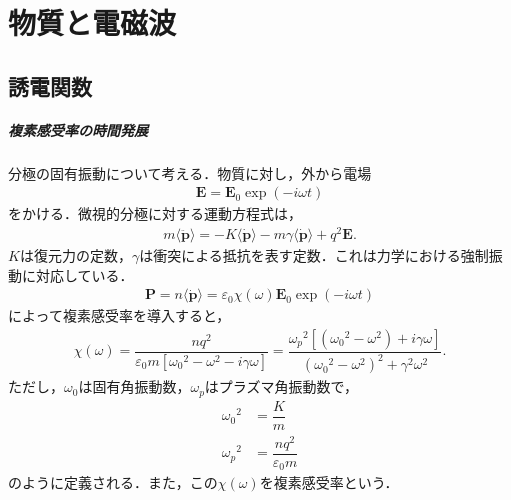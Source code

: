 \setcounter{chapter}{7}
\chapter{物質と電磁波}
\setcounter{section}{1}
\section{誘電関数}
\paragraph{複素感受率の時間発展}
分極の固有振動について考える．物質に対し，外から電場
\begin{align}
  \boldsymbol{E} = \boldsymbol{E}_0\exp(-i\omega{}t)
\end{align}
をかける．微視的分極に対する運動方程式は，
\begin{align}
  m\langle\ddot{\boldsymbol{p}}\rangle = -K\langle\dot{\boldsymbol{p}}\rangle - m\gamma\langle\dot{\boldsymbol{p}}\rangle + q^2\boldsymbol{E}.
  \label{adm_dev_eom}
\end{align}
$K$は復元力の定数，$\gamma$は衝突による抵抗を表す定数．これは力学における強制振動に対応している．
\begin{align}
  \boldsymbol{P} = n\langle\dot{\boldsymbol{p}}\rangle = \varepsilon_0\chi(\omega)\boldsymbol{E}_0\exp(-i\omega{}t)
\end{align}
によって複素感受率を導入すると，
\begin{align}
  \chi(\omega) = \dfrac{nq^2}{\varepsilon_0m[{\omega_0}^2-\omega^2-i\gamma\omega]} = \dfrac{{\omega_p}^2[({\omega_0}^2-{\omega}^2)+i\gamma\omega]}{({\omega_0}^2-{\omega}^2)^2+\gamma^2\omega^2}. \label{adm_dev_xw}
\end{align}
ただし，$\omega_0$は固有角振動数，$\omega_p$はプラズマ角振動数で，
\begin{align}
  {\omega_0}^2 &= \dfrac{K}{m}\\
  {\omega_p}^2 &= \dfrac{nq^2}{\varepsilon_0m}
\end{align}
のように定義される．また，この$\chi(\omega)$を複素感受率という．

